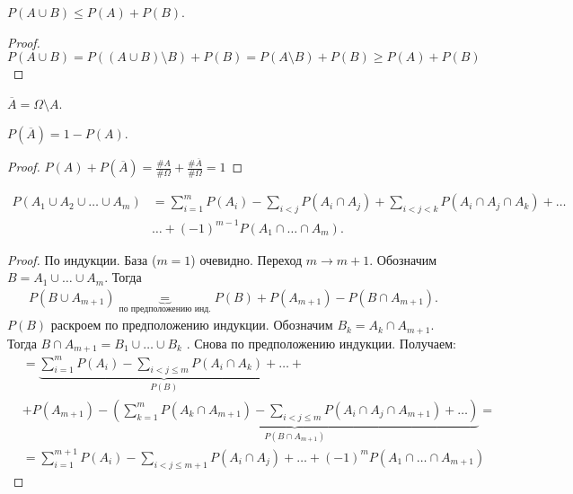 \documentclass[../main.tex]{subfiles}
\begin{document}
\begin{crly*}
 $P(A \cup B) \leqslant P(A) + P(B)$.
\end{crly*}

\begin{proof}
	\[
		P(A \cup B) = P((A \cup B) \setminus B) + P(B) = P(A \setminus B) + P(B) \ge P(A) + P(B)
	\]
\end{proof}

\begin{df*}
 $\overline A = \Omega \setminus A$.
\end{df*}
\begin{prop*}
 $P(\overline A) = 1 - P(A)$.
\end{prop*}

\begin{proof}
	$P(A) + P(\overline A) = \frac{\#A}{\#\Omega} + \frac{\#\overline A}{\#\Omega} = 1$     
\end{proof}
	
\begin{prop}
 \label{proposition:inclusion_exclusion_formula}
 \begin{align*}
  P(A_1 \cup A_2 \cup \ldots \cup A_m) &= \sum_{i=1}^{m} P(A_i) - \sum_{i < j} P(A_i \cap A_j) + \sum_{i < j < k}  P(A_i \cap A_j \cap A_k) + \ldots \\
  &\ldots + (-1)^{m - 1} P(A_1 \cap \ldots \cap A_m)
 .\end{align*} 
\end{prop}
\begin{proof}
 По индукции. База ($m=1$) очевидно. Переход $m \to m + 1$. Обозначим $B = A_1 \cup \ldots \cup A_m$. Тогда
 \begin{align*}
 P(B \cup A_{m+1}) \underbrace{=}_{\text{по предположению инд.}} P(B)+ P(A_{m+1}) - P(B \cap A_{m+1})
 .\end{align*} $P(B)$ раскроем по предположению индукции. Обозначим $B_k = A_k \cap A_{m+1}$. Тогда  $B \cap A_{m+1} = B_1 \cup \ldots \cup B_k$ . Снова по предположению индукции. Получаем:
 \begin{align*}
	&= \underbrace{\sum_{i=1}^{m} P(A_i) - \sum_{i < j \leqslant m} P(A_i \cap A_k) + \ldots}_{P(B)}
	+\\&+ P(A_{m+1})
	- \underbrace{\left( \sum_{k=1}^{m} P(A_k \cap A_{m+1})
	- \sum_{i < j \leqslant m} P(A_i \cap A_j \cap A_{m+1}) + \ldots \right)}_{P(B \cap A_{m + 1})}
	=\\&=\sum_{i = 1}^{m + 1} P(A_i) - \sum_{i < j \le m + 1} P(A_i \cap A_j) + \ldots + (-1)^m P(A_1 \cap \ldots \cap A_{m + 1})
 \end{align*} 
\end{proof}
\end{document}

